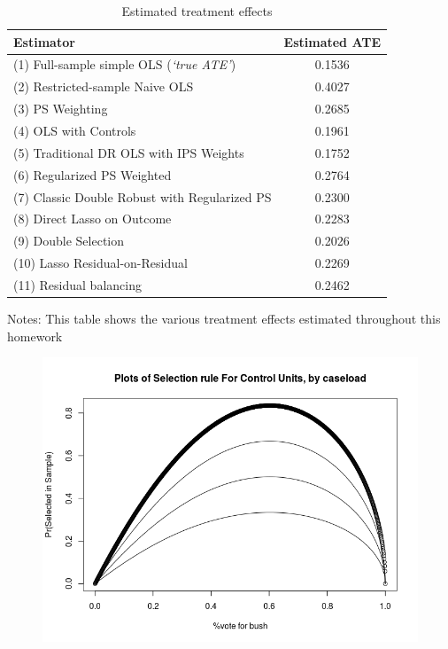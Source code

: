 \documentclass{article}
\begin{document}
\begin{table}[htbp]  \small
 \centering
  \begin{threeparttable}  
\caption{Estimated treatment effects \label{treat}}\begin{tabular}{l*{1}{c}}
\hline
Estimator           &     Estimated ATE     
\rule{0pt}{4ex}  \\
\hline\hline 
(1) Full-sample simple OLS (\textit{`true ATE'}) &  0.1536 \rule{0pt}{4ex} \\
\hline
(2) Restricted-sample Naive OLS &  0.4027 \rule{0pt}{4ex} \\
(3) PS Weighting          &            0.2685 \\
(4) OLS with Controls       &            0.1961 \\ \hline 
(5) Traditional DR OLS with IPS Weights & 0.1752 \rule{0pt}{4ex}\\
(6) Regularized PS Weighted &             0.2764 \\
(7) Classic Double Robust with Regularized PS & 0.2300 \\ 
(8) Direct  Lasso on Outcome &   0.2283 \\   \hline
(9) Double Selection       &    0.2026 \rule{0pt}{4ex} \\
(10) Lasso Residual-on-Residual & 0.2269 \\
(11) Residual balancing & 0.2462 \\
\end{tabular}
\begin{tablenotes}
\item Notes: This table shows the various treatment effects estimated throughout this homework
    \end{tablenotes}
  \end{threeparttable}
\end{table}



\begin{figure}
\caption{ }
\label{dc}
\center
\includegraphics[scale=1]{select_c.png}
\end{figure}
\end{document}
